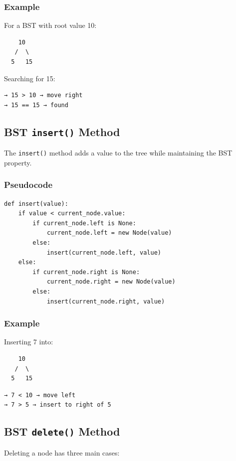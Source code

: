 \subsubsection*{Example}

For a BST with root value 10:
\begin{verbatim}
    10
   /  \
  5   15
\end{verbatim}
Searching for 15:
\begin{verbatim}
→ 15 > 10 → move right
→ 15 == 15 → found
\end{verbatim}

\subsection{BST \texttt{insert()} Method}

The \texttt{insert()} method adds a value to the tree while maintaining the BST property.

\subsubsection*{Pseudocode}
\begin{verbatim}
def insert(value):
    if value < current_node.value:
        if current_node.left is None:
            current_node.left = new Node(value)
        else:
            insert(current_node.left, value)
    else:
        if current_node.right is None:
            current_node.right = new Node(value)
        else:
            insert(current_node.right, value)
\end{verbatim}

\subsubsection*{Example}
Inserting 7 into:
\begin{verbatim}
    10
   /  \
  5   15
\end{verbatim}
\begin{verbatim}
→ 7 < 10 → move left
→ 7 > 5 → insert to right of 5
\end{verbatim}

\subsection{BST \texttt{delete()} Method}

Deleting a node has three main cases:

